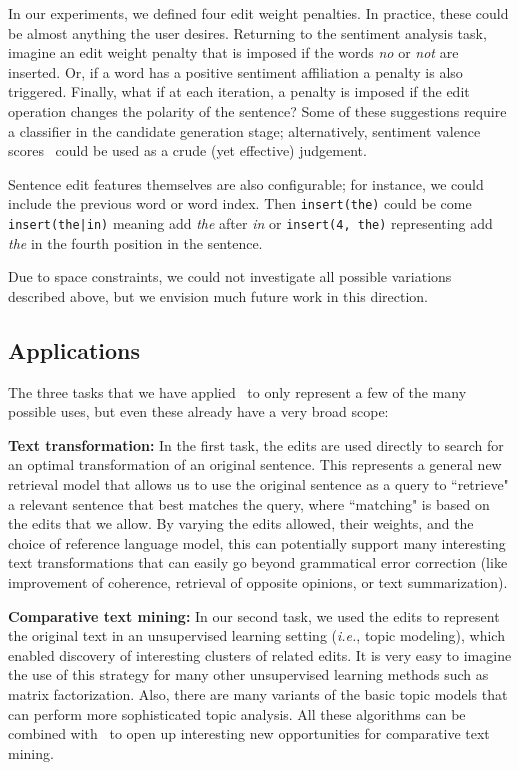 In our experiments, we defined four edit weight penalties. In practice, these
could be almost anything the user desires. Returning to the sentiment analysis
task, imagine an edit weight penalty that is imposed if the words \emph{no} or
\emph{not} are inserted. Or, if a word has a positive sentiment affiliation a
penalty is also triggered. Finally, what if at each iteration, a penalty is
imposed if the edit operation changes the polarity of the sentence? Some of
these suggestions require a classifier in the candidate generation stage;
alternatively, sentiment valence scores~\cite{sentiment} could be used as a
crude (yet effective) judgement.

Sentence edit features themselves are also configurable; for instance, we could
include the previous word or word index. Then \texttt{insert(the)} could be come
\texttt{insert(the|in)} meaning add \emph{the} after \emph{in} or
\texttt{insert(4, the)} representing add \emph{the} in the fourth position in
the sentence.

Due to space constraints, we could not investigate all possible variations
described above, but we envision much future work in this direction.

\subsection{Applications}

The three tasks that we have applied \sd~to only represent a few of the many
possible uses, but even these already have a very broad scope:

\noindent
{\bf Text transformation:} In the first task, the edits
are used directly to search for an optimal transformation of an original
sentence. This represents a general new retrieval model that allows us
to use the original sentence as a query to ``retrieve" a relevant sentence that
best matches the query, where ``matching" is based on the edits that we allow.
By varying the edits allowed, their weights, and the choice of reference
language model, this can potentially support many interesting text
transformations that can easily go beyond grammatical error correction (like
improvement of coherence, retrieval of opposite opinions, or text
summarization).

\noindent
{\bf Comparative text mining:} In our second task, we used the edits to
represent the original text in an unsupervised learning setting (\emph{i.e.},
topic modeling), which enabled discovery of interesting clusters of related
edits. It is very easy to imagine the use of this strategy for many other
unsupervised learning methods such as matrix factorization. Also, there are many
variants of the basic topic models that can perform more sophisticated topic
analysis. All these algorithms can be combined with \sd~to open up interesting
new opportunities for comparative text mining.

